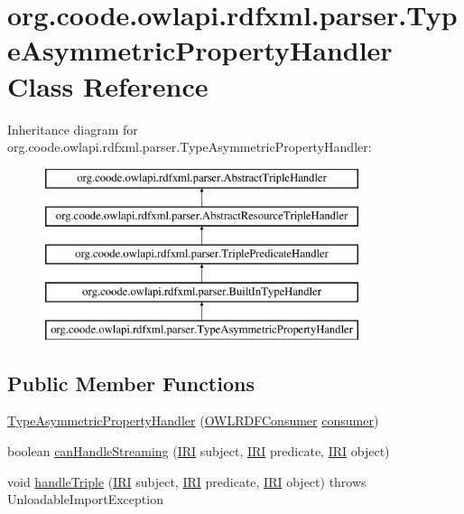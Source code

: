 \hypertarget{classorg_1_1coode_1_1owlapi_1_1rdfxml_1_1parser_1_1_type_asymmetric_property_handler}{\section{org.\-coode.\-owlapi.\-rdfxml.\-parser.\-Type\-Asymmetric\-Property\-Handler Class Reference}
\label{classorg_1_1coode_1_1owlapi_1_1rdfxml_1_1parser_1_1_type_asymmetric_property_handler}
}
Inheritance diagram for org.\-coode.\-owlapi.\-rdfxml.\-parser.\-Type\-Asymmetric\-Property\-Handler\-:\begin{figure}[H]
\begin{center}
\leavevmode
\includegraphics[height=5.000000cm]{classorg_1_1coode_1_1owlapi_1_1rdfxml_1_1parser_1_1_type_asymmetric_property_handler}
\end{center}
\end{figure}
\subsection*{Public Member Functions}
\begin{DoxyCompactItemize}
\item 
\hyperlink{classorg_1_1coode_1_1owlapi_1_1rdfxml_1_1parser_1_1_type_asymmetric_property_handler_a3361605c7fd4854070fab746eabbf62a}{Type\-Asymmetric\-Property\-Handler} (\hyperlink{classorg_1_1coode_1_1owlapi_1_1rdfxml_1_1parser_1_1_o_w_l_r_d_f_consumer}{O\-W\-L\-R\-D\-F\-Consumer} \hyperlink{classorg_1_1coode_1_1owlapi_1_1rdfxml_1_1parser_1_1_abstract_triple_handler_a4ccf4d898ff01eb1cadfa04b23d54e9c}{consumer})
\item 
boolean \hyperlink{classorg_1_1coode_1_1owlapi_1_1rdfxml_1_1parser_1_1_type_asymmetric_property_handler_a2d8ea64ba2b6b2a1e4dcdc95b74473f9}{can\-Handle\-Streaming} (\hyperlink{classorg_1_1semanticweb_1_1owlapi_1_1model_1_1_i_r_i}{I\-R\-I} subject, \hyperlink{classorg_1_1semanticweb_1_1owlapi_1_1model_1_1_i_r_i}{I\-R\-I} predicate, \hyperlink{classorg_1_1semanticweb_1_1owlapi_1_1model_1_1_i_r_i}{I\-R\-I} object)
\item 
void \hyperlink{classorg_1_1coode_1_1owlapi_1_1rdfxml_1_1parser_1_1_type_asymmetric_property_handler_a6bba86d5bd593770e60d227c041e5a57}{handle\-Triple} (\hyperlink{classorg_1_1semanticweb_1_1owlapi_1_1model_1_1_i_r_i}{I\-R\-I} subject, \hyperlink{classorg_1_1semanticweb_1_1owlapi_1_1model_1_1_i_r_i}{I\-R\-I} predicate, \hyperlink{classorg_1_1semanticweb_1_1owlapi_1_1model_1_1_i_r_i}{I\-R\-I} object)  throws Unloadable\-Import\-Exception 
\end{DoxyCompactItemize}
